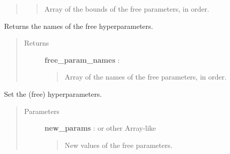 \documentclass[letterpaper,10pt,english]{sphinxmanual}
\begin{document}
\begin{fulllineitems}
\begin{fulllineitems}
\begin{quote}
\begin{description}
\begin{quote}
Array of the bounds of the free parameters, in order.
\end{quote}

\end{description}\end{quote}

\end{fulllineitems}


\begin{fulllineitems}
\label{gptools.kernel:gptools.kernel.core.BinaryKernel.free_param_names}
Returns the names of the free hyperparameters.
\begin{quote}\begin{description}
\item[{Returns}] \leavevmode
\textbf{free\_param\_names} : 
\begin{quote}

Array of the names of the free parameters, in order.
\end{quote}

\end{description}\end{quote}

\end{fulllineitems}


\begin{fulllineitems}
\label{gptools.kernel:gptools.kernel.core.BinaryKernel.params}
\end{fulllineitems}


\begin{fulllineitems}
\label{gptools.kernel:gptools.kernel.core.BinaryKernel.set_hyperparams}
Set the (free) hyperparameters.
\begin{quote}\begin{description}
\item[{Parameters}] \leavevmode
\textbf{new\_params} :  or other Array-like
\begin{quote}

New values of the free parameters.
\end{quote}


\end{description}
\end{quote}
\end{fulllineitems}
\end{fulllineitems}
\end{document}
